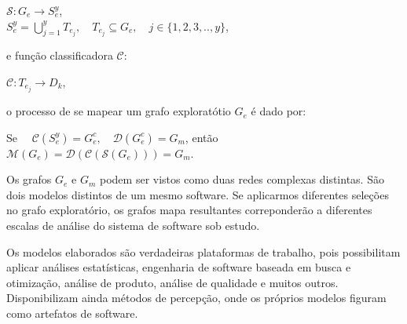 \begin{center}
  $\mathcal{S}:G_e \rightarrow S_e^y$,
   \\
   \hfill \break
  $S_e^y = \bigcup\limits_{j=1}^y T_{e_j},
   \quad T_{e_j} \subseteq G_e,
   \quad j \in \{ 1, 2, 3, .., y \}$,
\end{center}

e função classificadora $\mathcal{C}$:

\begin{center}
  $\mathcal{C}:T_{e_j} \rightarrow D_k$,
\end{center}

o processo de se mapear um grafo exploratótio $G_e$ é dado por:

\begin{center}
  Se $\quad \mathcal{C}({S_e^y}) = {G_e^c},
      \quad \mathcal{D}({G_e^c}) = {G_m}$, então
      \\
      \hfill \break
     $\mathcal{M}({G_e}) = \mathcal{D}(\mathcal{C}(\mathcal{S}({G_e}))) = {G_m}$.
\end{center}

Os grafos $G_e$ e $G_m$ podem ser vistos como duas redes complexas distintas.
São dois modelos distintos de um mesmo software. Se aplicarmos diferentes
seleções no grafo exploratório, os grafos mapa resultantes correponderão a
diferentes escalas de análise do sistema de software sob estudo.

Os modelos elaborados são verdadeiras plataformas de trabalho, pois possibilitam
aplicar análises estatísticas, engenharia de software baseada em busca e
otimização, análise de produto, análise de qualidade e muitos outros.
Disponibilizam ainda métodos de percepção, onde os próprios modelos figuram
como artefatos de software.

